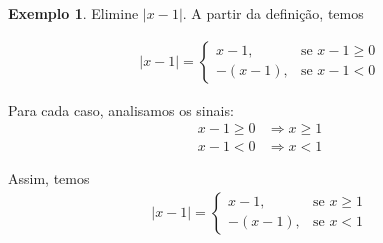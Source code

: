 \documentclass[12pt,openright,twoside,a4paper]{article}
\theoremstyle{definition}
\newtheorem{example}{Exemplo}[section]
\begin{document}
	\begin{example}Elimine $|x - 1|$. A partir da definição, temos
		
		\begin{align*}
			|x - 1| =
			\begin{cases}
				x - 1, & \text{se } x - 1 \geq 0 \\
				- (x - 1), & \text{se } x - 1 < 0
			\end{cases}
		\end{align*}
		
		Para cada caso, analisamos os sinais:
		\begin{align*}
			x - 1 \geq 0 &\Rightarrow x \geq 1 \\
			x - 1 < 0 & \Rightarrow x < 1
		\end{align*}
		
		Assim, temos
		\begin{align*}
			|x - 1| =
			\begin{cases}
				x - 1, & \text{se } x \geq 1 \\
				- (x - 1), & \text{se }  x < 1
			\end{cases}
		\end{align*}
	\end{example}
	
\end{document}
